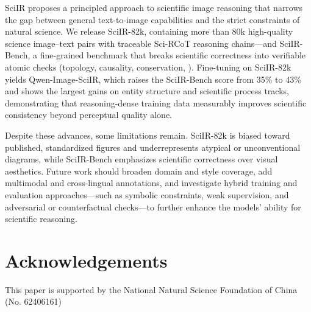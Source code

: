 \documentclass[runningheads]{llncs}
\begin{document}
SciIR proposes a principled approach to scientific image reasoning that narrows the gap between general text-to-image capabilities and the strict constraints of natural science. We release SciIR-82k, containing more than 80k high-quality science image–text pairs with traceable Sci-RCoT reasoning chains—and SciIR-Bench, a fine-grained benchmark that breaks scientific correctness into verifiable atomic checks (topology, causality, conservation, \etc). Fine-tuning on SciIR-82k yields Qwen-Image-SciIR, which raises the SciIR-Bench score from 35\% to 43\% and shows the largest gains on entity structure and scientific process tracks, demonstrating that reasoning-dense training data measurably improves scientific consistency beyond perceptual quality alone.

Despite these advances, some limitations remain. SciIR-82k is biased toward published, standardized figures and underrepresents atypical or unconventional diagrams, while SciIR-Bench emphasizes scientific correctness over visual aesthetics. Future work should broaden domain and style coverage, add multimodal and cross-lingual annotations, and investigate hybrid training and evaluation approaches—such as symbolic constraints, weak supervision, and adversarial or counterfactual checks—to further enhance the models’ ability for scientific reasoning.


%
\section*{Acknowledgements}
This paper is supported by the National Natural Science Foundation of China (No. 62406161)


\end{document}

